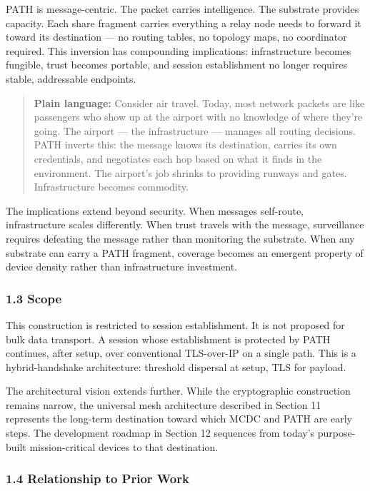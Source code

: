 \documentclass[
  11pt,
]{article}
\begin{document}
PATH is message-centric. The packet carries intelligence. The substrate
provides capacity. Each share fragment carries everything a relay node
needs to forward it toward its destination --- no routing tables, no
topology maps, no coordinator required. This inversion has compounding
implications: infrastructure becomes fungible, trust becomes portable,
and session establishment no longer requires stable, addressable
endpoints.

\begin{quote}
\textbf{Plain language:} Consider air travel. Today, most network
packets are like passengers who show up at the airport with no knowledge
of where they're going. The airport --- the infrastructure --- manages
all routing decisions. PATH inverts this: the message knows its
destination, carries its own credentials, and negotiates each hop based
on what it finds in the environment. The airport's job shrinks to
providing runways and gates. Infrastructure becomes commodity.
\end{quote}

The implications extend beyond security. When messages self-route,
infrastructure scales differently. When trust travels with the message,
surveillance requires defeating the message rather than monitoring the
substrate. When any substrate can carry a PATH fragment, coverage
becomes an emergent property of device density rather than
infrastructure investment.

\hypertarget{scope}{%
\subsubsection{1.3 Scope}\label{scope}}

This construction is restricted to session establishment. It is not
proposed for bulk data transport. A session whose establishment is
protected by PATH continues, after setup, over conventional TLS-over-IP
on a single path. This is a hybrid-handshake architecture: threshold
dispersal at setup, TLS for payload.

The architectural vision extends further. While the cryptographic
construction remains narrow, the universal mesh architecture described
in Section 11 represents the long-term destination toward which MCDC and
PATH are early steps. The development roadmap in Section 12 sequences
from today's purpose-built mission-critical devices to that destination.

\hypertarget{relationship-to-prior-work}{%
\subsubsection{1.4 Relationship to Prior
Work}\label{relationship-to-prior-work}}
\end{document}
